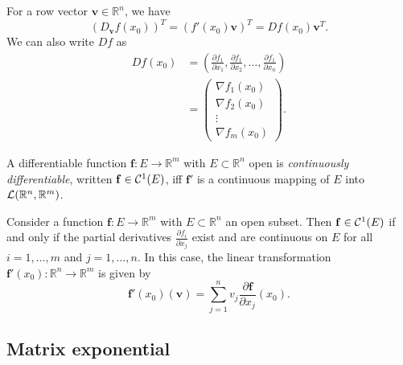 \begin{rem}
  For a row vector $\mathbf{v}\in \mathbb{R}^n$,
  we have
  \begin{displaymath}
    (D_{\mathbf{v}} f(x_0))^T = (f'(x_0)\mathbf{v})^T = D f(x_0) \mathbf{v}^T.
  \end{displaymath}
  We can also write $D f$ as
  \begin{align*}
    Df(x_0) &= \left(
      \frac{\partial f_1}{\partial x_1},
      \frac{\partial f_1}{\partial x_2},
      \ldots, 
      \frac{\partial f_1}{\partial x_n}\right)
    \\
    &=
      \begin{pmatrix}
        \nabla f_1(x_0)
        \\
        \nabla f_2(x_0)
        \\
        \vdots
        \\
        \nabla f_m(x_0)
      \end{pmatrix}.
  \end{align*}
\end{rem}

\begin{defn}
  \label{def:C1VecFunc}
  A differentiable function $\mathbf{f}: E\rightarrow \mathbb{R}^m$
  with $E\subset \mathbb{R}^n$ open
  is \emph{continuously differentiable},
  written $\mathbf{f}\in{\cal C}^1(E)$, 
  iff $\mathbf{f}'$ is a continuous mapping of $E$
  into ${\cal L}(\mathbb{R}^n,\mathbb{R}^m)$.
\end{defn}

\begin{thm}
  \label{thm:continuousParitialDerivativesImplyDifferentiability}
  Consider a function $\mathbf{f}: E\rightarrow \mathbb{R}^m$
  with $E\subset \mathbb{R}^n$ an open subset.
  Then $\mathbf{f}\in {\cal C}^1(E)$
  if and only if the partial derivatives $\frac{\partial f_i}{\partial x_j}$
  exist and are continuous on $E$ for all $i=1,\ldots,m$ and $j=1,\ldots,n$.
  In this case, the linear transformation
  $\mathbf{f}'(x_0): \mathbb{R}^n \rightarrow \mathbb{R}^m$ is given by
  \begin{equation}
    \label{eq:continuousParitialDerivativesImplyDifferentiability}
    \mathbf{f}'(x_0) (\mathbf{v})
    = \sum_{j=1}^n v_j \frac{\partial \mathbf{f}}{\partial x_j} (x_0).
  \end{equation}
\end{thm}



\subsection{Matrix exponential}
\label{sec:matrix-exponential}

